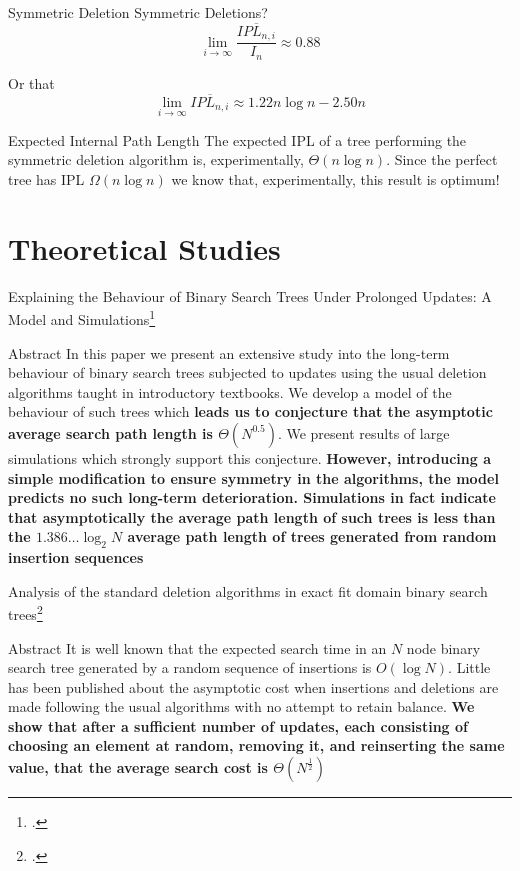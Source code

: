 \documentclass{beamer}
\begin{document}
\begin{frame}{Symmetric Deletion}
    Symmetric Deletions?
    \pause
    $$
    \lim_{i \to \infty} \frac{\overline{IPL_{n,i}}}{I_n} \approx 0.88
    $$

    Or that
    $$
    \lim_{i \to \infty} \overline{IPL_{n,i}}\approx 1.22n \log n - 2.50n
    $$
    \pause
    \begin{block}{Expected Internal Path Length}
        The expected IPL of a tree performing the symmetric deletion algorithm is, experimentally, $\Theta(n \log n)$. Since the perfect tree has IPL $\Omega(n \log n)$ we know that, experimentally, this result is optimum!
    \end{block}
\end{frame}

\section{Theoretical Studies}

\begin{frame}{Explaining the Behaviour of Binary Search Trees Under Prolonged Updates: A Model and Simulations\footcite{culberson1989explaining}}
    \footnotesize
    \begin{block}{Abstract}
        In this paper we present an extensive study into the long-term behaviour of binary search trees subjected to updates using the usual deletion algorithms taught in introductory textbooks. We develop a model of the behaviour of such trees which \textbf{leads us to conjecture that the asymptotic average search path length is $\Theta(N^{0.5})$}. We present results of large simulations which strongly support this conjecture. \textbf{However, introducing a simple modification to ensure symmetry in the algorithms, the model predicts no such long-term deterioration. Simulations in fact indicate that asymptotically the average path length of such trees is less than the $1.386\ldots\log_2 N$ average path length of trees generated from random insertion sequences}
    \end{block}
\end{frame}

\begin{frame}{Analysis of the standard deletion algorithms in exact fit domain binary search trees\footcite{culberson1990analysis}}
    \begin{block}{Abstract}
        It is well known that the expected search time in an $N$ node binary search tree generated by a random sequence of insertions is $O(\log N)$. Little has been published about the asymptotic cost when insertions and deletions are made following the usual algorithms with no attempt to retain balance. \textbf{We show that after a sufficient number of updates, each consisting of choosing an element at random, removing it, and reinserting the same value, that the average search cost is $\Theta(N^{\frac{1}{2}})$}
    \end{block}
\end{frame}
\end{document}
